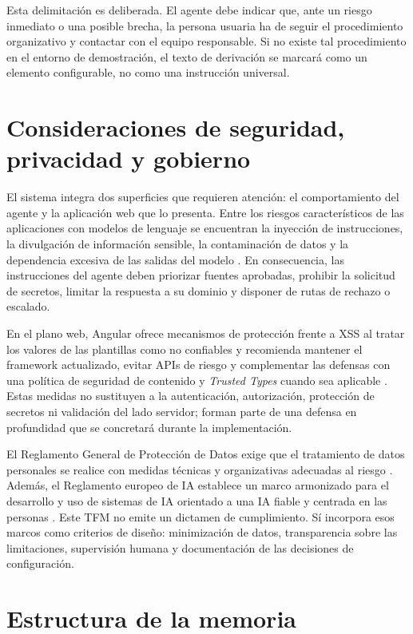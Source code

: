 \documentclass[12pt,twoside,titlepage]{book}
\begin{document}
Esta delimitación es deliberada. El agente debe indicar que, ante un riesgo
inmediato o una posible brecha, la persona usuaria ha de seguir el procedimiento
organizativo y contactar con el equipo responsable. Si no existe tal
procedimiento en el entorno de demostración, el texto de derivación se marcará
como un elemento configurable, no como una instrucción universal.

\section{Consideraciones de seguridad, privacidad y gobierno}
\label{sec:consideraciones-intro}

El sistema integra dos superficies que requieren atención: el comportamiento del
agente y la aplicación web que lo presenta. Entre los riesgos característicos de
las aplicaciones con modelos de lenguaje se encuentran la inyección de
instrucciones, la divulgación de información sensible, la contaminación de datos
y la dependencia excesiva de las salidas del modelo \cite{owaspLlm2026}. En
consecuencia, las instrucciones del agente deben priorizar fuentes aprobadas,
prohibir la solicitud de secretos, limitar la respuesta a su dominio y disponer
de rutas de rechazo o escalado.

En el plano web, Angular ofrece mecanismos de protección frente a XSS al tratar
los valores de las plantillas como no confiables y recomienda mantener el
framework actualizado, evitar APIs de riesgo y complementar las defensas con una
política de seguridad de contenido y \emph{Trusted Types} cuando sea aplicable
\cite{angularSecurity}. Estas medidas no sustituyen a la autenticación,
autorización, protección de secretos ni validación del lado servidor; forman
parte de una defensa en profundidad que se concretará durante la implementación.

El Reglamento General de Protección de Datos exige que el tratamiento de datos
personales se realice con medidas técnicas y organizativas adecuadas al riesgo
\cite{gdpr}. Además, el Reglamento europeo de IA establece un marco armonizado
para el desarrollo y uso de sistemas de IA orientado a una IA fiable y centrada
en las personas \cite{aiAct}. Este TFM no emite un dictamen de cumplimiento.
Sí incorpora esos marcos como criterios de diseño: minimización de datos,
transparencia sobre las limitaciones, supervisión humana y documentación de las
decisiones de configuración.

\section{Estructura de la memoria}
\label{sec:estructura-memoria}
\end{document}
